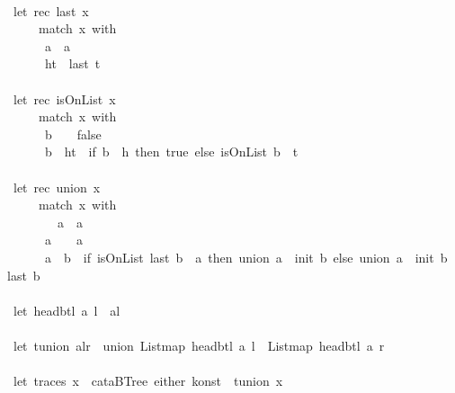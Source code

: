 \documentclass[a4paper]{article}
\begin{document}
\begin{tabbing}
\ttfamily ~\\
\ttfamily ~let~rec~last~x~\\
\ttfamily ~~~~~match~x~with\\
\ttfamily ~~~~~~a~~a\\
\ttfamily ~~~~~~ht~~last~t\\
\ttfamily ~\\
\ttfamily ~let~rec~isOnList~x~\\
\ttfamily ~~~~~match~x~with\\
\ttfamily ~~~~~~b~~~~false\\
\ttfamily ~~~~~~b~~ht~~if~b~~h~then~true~else~isOnList~b~~t\\
\ttfamily ~\\
\ttfamily ~let~rec~union~x~\\
\ttfamily ~~~~~match~x~with\\
\ttfamily ~~~~~~~~a~~a\\
\ttfamily ~~~~~~a~~~~a\\
\ttfamily ~~~~~~a~~b~~if~isOnList~last~b~~a~then~union~a~~init~b~else~union~a~~init~b~~last~b\\
\ttfamily ~\\
\ttfamily ~let~headbtl~a~l~~al\\
\ttfamily ~\\
\ttfamily ~let~tunion~alr~~union~Listmap~headbtl~a~l~~Listmap~headbtl~a~r\\
\ttfamily ~\\
\ttfamily ~let~traces~x~~cataBTree~either~konst~~tunion~x\\

\end{tabbing}
\end{document}
